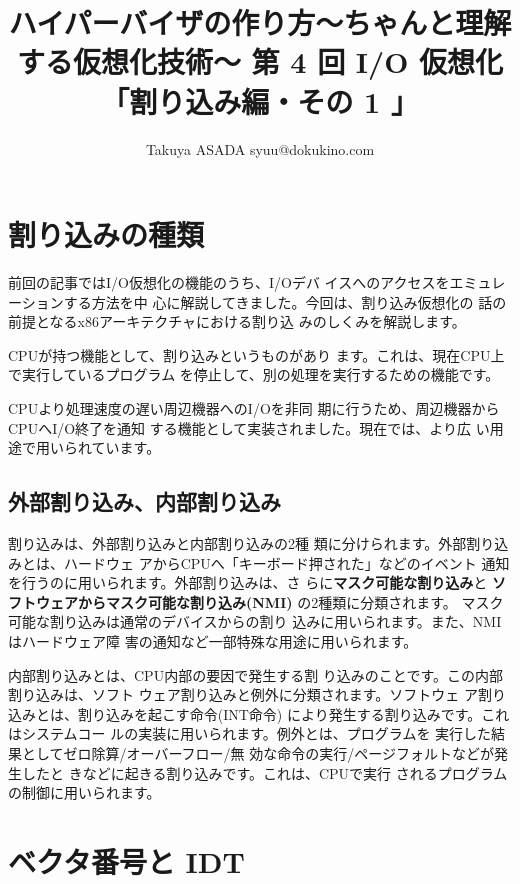 
\title{ハイパーバイザの作り方～ちゃんと理解する仮想化技術～ 第 4 回 I/O 仮想化「割り込み編・その 1 」}
 \author{Takuya ASADA syuu@dokukino.com}

\maketitle

\section{割り込みの種類}

 前回の記事ではI/O仮想化の機能のうち、I/Oデバ
イスへのアクセスをエミュレーションする方法を中
心に解説してきました。今回は、割り込み仮想化の
話の前提となるx86アーキテクチャにおける割り込
みのしくみを解説します。

 CPUが持つ機能として、割り込みというものがあり
ます。これは、現在CPU上で実行しているプログラム
を停止して、別の処理を実行するための機能です。

 CPUより処理速度の遅い周辺機器へのI/Oを非同
期に行うため、周辺機器からCPUへI/O終了を通知
する機能として実装されました。現在では、より広
い用途で用いられています。

\subsection{外部割り込み、内部割り込み}

 割り込みは、外部割り込みと内部割り込みの2種
類に分けられます。外部割り込みとは、ハードウェ
アからCPUへ「キーボード押された」などのイベント
通知を行うのに用いられます。外部割り込みは、さ
らに{\bf マスク可能な割り込み}と
{\bf ソフトウェアからマスク可能な割り込み(NMI)}
の2種類に分類されます。
マスク可能な割り込みは通常のデバイスからの割り
込みに用いられます。また、NMIはハードウェア障
害の通知など一部特殊な用途に用いられます。

 内部割り込みとは、CPU内部の要因で発生する割
り込みのことです。この内部割り込みは、ソフト
ウェア割り込みと例外に分類されます。ソフトウェ
ア割り込みとは、割り込みを起こす命令(INT命令)
により発生する割り込みです。これはシステムコー
ルの実装に用いられます。例外とは、プログラムを
実行した結果としてゼロ除算/オーバーフロー/無
効な命令の実行/ページフォルトなどが発生したと
きなどに起きる割り込みです。これは、CPUで実行
されるプログラムの制御に用いられます。


\section{ベクタ番号と IDT}

